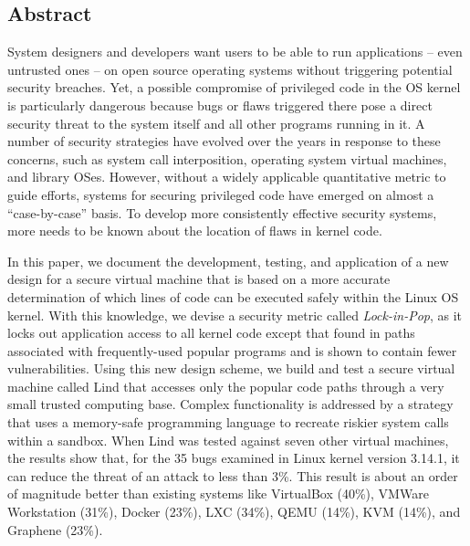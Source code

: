 \subsection*{Abstract}
System designers and developers want users to be able to 
run applications -- even untrusted ones -- on open source operating systems 
without triggering potential security breaches. Yet, a possible compromise of privileged code 
in the OS kernel is particularly dangerous because bugs or flaws triggered there pose a direct security threat 
to the system itself and all other programs running in it. A number of security strategies have evolved over the years 
in response to these concerns, such as system call interposition, operating system virtual machines, and library OSes. 
However, without a widely applicable quantitative metric to guide efforts, systems for securing privileged code 
have emerged on almost a ``case-by-case'' basis. To develop more consistently effective security systems, 
more needs to be known about the location of flaws in kernel code.

In this paper, we document the development, testing, and application of a new design for a secure virtual machine 
that is based on a more accurate determination of which lines of code can be executed safely within the Linux OS kernel. 
With this knowledge, we devise a security metric called \emph{Lock-in-Pop}, as it locks out application access to all kernel code 
except that found in paths associated with frequently-used popular programs and is shown to contain fewer vulnerabilities. 
Using this new design scheme, we build and test  a secure virtual machine called Lind that accesses only 
the popular code paths through a very small trusted computing base. Complex functionality is addressed 
by a strategy that uses a memory-safe programming language to recreate riskier system calls within a sandbox. 
When Lind was tested against seven other virtual machines, the results show that, for the 35 bugs examined in Linux kernel version 3.14.1, 
it can reduce the threat of an attack to less than 3\%. 
This result is about an order of magnitude better than existing systems like VirtualBox (40\%), VMWare Workstation (31\%), Docker (23\%), 
LXC (34\%), QEMU (14\%), KVM (14\%), and Graphene (23\%).